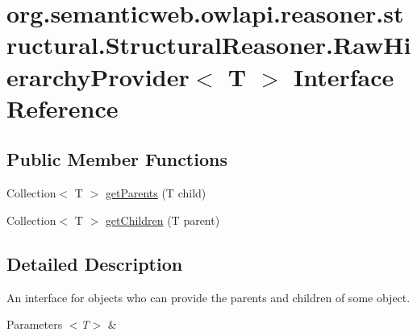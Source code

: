 \hypertarget{interfaceorg_1_1semanticweb_1_1owlapi_1_1reasoner_1_1structural_1_1_structural_reasoner_1_1_raw_hierarchy_provider_3_01_t_01_4}{\section{org.\-semanticweb.\-owlapi.\-reasoner.\-structural.\-Structural\-Reasoner.\-Raw\-Hierarchy\-Provider$<$ T $>$ Interface Reference}
\label{interfaceorg_1_1semanticweb_1_1owlapi_1_1reasoner_1_1structural_1_1_structural_reasoner_1_1_raw_hierarchy_provider_3_01_t_01_4}
}
\subsection*{Public Member Functions}
\begin{DoxyCompactItemize}
\item 
Collection$<$ T $>$ \hyperlink{interfaceorg_1_1semanticweb_1_1owlapi_1_1reasoner_1_1structural_1_1_structural_reasoner_1_1_raw_hierarchy_provider_3_01_t_01_4_adbc3711e0fcbce536dda6d186aa7e042}{get\-Parents} (T child)
\item 
Collection$<$ T $>$ \hyperlink{interfaceorg_1_1semanticweb_1_1owlapi_1_1reasoner_1_1structural_1_1_structural_reasoner_1_1_raw_hierarchy_provider_3_01_t_01_4_a48fa00f58f87108fe700f26c391e89ab}{get\-Children} (T parent)
\end{DoxyCompactItemize}


\subsection{Detailed Description}
An interface for objects who can provide the parents and children of some object. 
\begin{DoxyParams}{Parameters}
{\em $<$\-T$>$} & \\
\hline
\end{DoxyParams}


